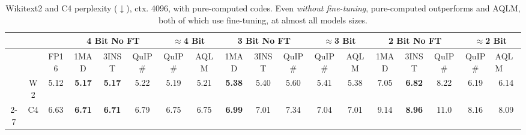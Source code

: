 \begin{table}[t]
\caption{Wikitext2 and C4 perplexity ($\downarrow$), ctx. 4096, \qts with pure-computed codes. Even \textit{without fine-tuning}, pure-computed \qts outperforms \qss and AQLM, both of which use fine-tuning, at almost all models sizes.}
\centering
\small\sc
\tabcolsep=0.075cm
\begin{tabular}{@{}cccccccccccccccccc@{}}
\multicolumn{1}{l}{}                           & \multicolumn{1}{l}{}                            & \multicolumn{1}{l}{}                              & \multicolumn{3}{c}{4 Bit No FT}                                                   & \multicolumn{2}{c}{$\approx$4 Bit}                        & \multicolumn{3}{c}{3 Bit No FT}                                                   & \multicolumn{2}{c}{$\approx$3 Bit}                        & \multicolumn{3}{c}{2 Bit No FT}                                                   & \multicolumn{2}{c}{$\approx$2 Bit} \\ \midrule
\multicolumn{1}{l}{}                           & \multicolumn{1}{l|}{}                           & \multicolumn{1}{c|}{\tiny FP16}                         & \tiny 1MAD          & \tiny 3INST         & \multicolumn{1}{c|}{\tiny QuIP\#}                       & \tiny QuIP\# & \multicolumn{1}{c|}{\tiny AQLM}                         & \tiny 1MAD          & \tiny 3INST         & \multicolumn{1}{c|}{\tiny QuIP\#}                       & \tiny QuIP\# & \multicolumn{1}{c|}{\tiny AQLM}                         & \tiny 1MAD          & \tiny 3INST         & \multicolumn{1}{c|}{\tiny QuIP\#}                       & \tiny QuIP\#  & \multicolumn{1}{l}{\tiny AQLM}  \\ \midrule
                                               & \multicolumn{1}{c|}{W2}                         & \multicolumn{1}{c|}{5.12}                         & \textbf{5.17} & \textbf{5.17} & \multicolumn{1}{c|}{5.22}                         & 5.19  & \multicolumn{1}{c|}{5.21}                         & \textbf{5.38} & 5.40          & \multicolumn{1}{c|}{5.60}                         & 5.41  & \multicolumn{1}{c|}{5.38}                         & 7.05          & \textbf{6.82} & \multicolumn{1}{c|}{8.22}                         & 6.19   & 6.14                      \\
\multirow{-2}{*}{2-7}                          & \multicolumn{1}{c|}{C4}                         & \multicolumn{1}{c|}{6.63}                         & \textbf{6.71} & \textbf{6.71} & \multicolumn{1}{c|}{6.79}                         & 6.75  & \multicolumn{1}{c|}{6.75}                         & \textbf{6.99} & 7.01          & \multicolumn{1}{c|}{7.34}                         & 7.04  & \multicolumn{1}{c|}{7.01}                         & 9.14          & \textbf{8.96} & \multicolumn{1}{c|}{11.0}                         & 8.16   & 8.09                      \\

\end{tabular}
\end{table}
